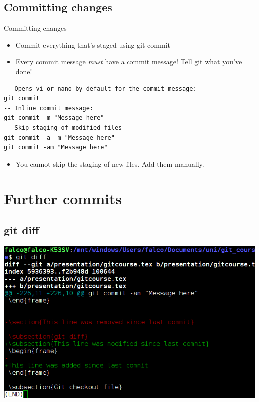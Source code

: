 \documentclass[10pt,a4paper]{beamer}
\begin{document}
\subsection{Committing changes}
\begin{frame}[fragile]{Committing changes}
\begin{itemize}
\item Commit everything that's staged using git commit
\item Every commit message \textit{must} have a commit message! Tell git what you've done!
\end{itemize}
\begin{verbatim}
-- Opens vi or nano by default for the commit message:
git commit
-- Inline commit message:
git commit -m "Message here"
-- Skip staging of modified files
git commit -a -m "Message here"
git commit -am "Message here"
\end{verbatim}
\begin{itemize}
\item You cannot skip the staging of new files. Add them manually.
\end{itemize}
\end{frame}


\section{Further commits}

\subsection{git diff}
\begin{frame}
\includegraphics[width=\linewidth]{gitdiff.png}
\end{frame}
\end{document}
